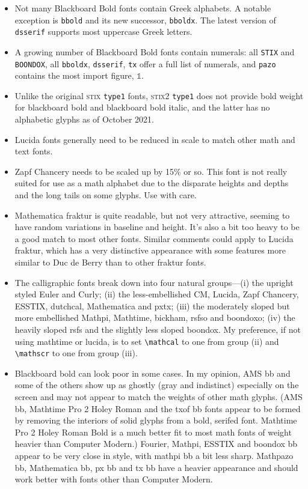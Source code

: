 \documentclass[11pt]{article}
\begin{document}
\begin{itemize}
\item Not many Blackboard Bold fonts contain Greek alphabets. A notable exception is {\tt bbold} and its new successor, {\tt bboldx}. The latest version of {\tt dsserif} supports most uppercase Greek letters.
\item A growing number of Blackboard Bold fonts contain numerals: all {\tt STIX} and {\tt BOONDOX}, all {\tt bboldx}, {\tt dsserif}, {\tt tx} offer a full list of numerals, and {\tt pazo} contains the most import figure, $\mathbb{1}$.
\item Unlike the original \textsc{stix} {\tt type1} fonts, \textsc{stix2} {\tt type1} does not provide bold weight for blackboard bold and blackboard bold italic, and the latter has no alphabetic glyphs as of October 2021.
\item
\textsf{Lucida} fonts generally need to be reduced in scale to match other math and text fonts.
\item \textsf{Zapf Chancery} needs to be scaled up by 15\% or so. This font is not really suited for use as a math alphabet due to the disparate heights and depths and the long tails on some glyphs. Use with care.
\item \textsf{Mathematica} fraktur is quite readable, but not very attractive, seeming to have random variations in baseline and height. It's also a bit too heavy to be a good match to most other fonts. Similar comments could apply to \textsf{Lucida} fraktur, which has a very distinctive appearance with some features more similar to \textsf{Duc de Berry} than to other fraktur fonts.
\item The calligraphic fonts break down into four natural groups---(i) the upright styled \textsf{Euler} and \textsf{Curly}; (ii) the less-embellished \textsf{CM, Lucida, Zapf Chancery, ESSTIX, dutchcal,  Mathematica} and \textsf{pxtx}; (iii) the moderately sloped but more embellished {Mathpi, Mathtime, bickham, rsfso} and \textsf{boondoxo}; (iv) the heavily sloped rsfs and the slightly less sloped boondox. My preference, if not using \textsf{mathtime} or \textsf{lucida}, is to set \verb|\mathcal| to one from group (ii) and \verb|\mathscr| to one from group (iii).
    \item Blackboard bold can look poor in some cases. In my opinion, \textsf{AMS} bb and some of the others show up as ghostly (gray and indistinct) especially on the screen and may not appear to match the weights of other math glyphs. (\textsf{AMS bb, Mathtime Pro 2 Holey Roman} and the \textsf{txof} bb fonts appear to be formed by removing the interiors of solid glyphs from a bold, serifed font. \textsf{Mathtime Pro 2 Holey Roman Bold} is a much better fit to most math fonts of weight heavier than \textsf{Computer Modern}.) \textsf{Fourier,  Mathpi, ESSTIX} and \textsf{boondox} bb appear to be very close in style, with \textsf{mathpi} bb a bit less sharp. \textsf{Mathpazo bb, Mathematica bb, px bb} and \textsf{tx bb} have a heavier appearance and should work better with fonts other than \textsf{Computer Modern}.
\end{itemize}
\end{document}

